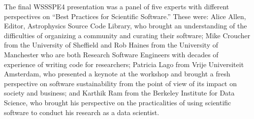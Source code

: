 \documentclass[11pt, oneside]{amsart}
\newcommand{\note}[1]{ {\textcolor{blueish}    { ***Note:      #1 }}}
\begin{document}







The final WSSSPE4 presentation was a panel %
of five experts with different perspectives on ``Best Practices for Scientific Software.''
These were: Alice Allen, Editor, Astrophysics Source Code Library, who brought an understanding of the difficulties of organizing a community and curating their software;
Mike Croucher from the University of Sheffield and Rob Haines from the University of Manchester who are both Research Software Engineers with decades of experience of writing code for researchers;
Patricia Lago from Vrije Universiteit Amsterdam, who presented a keynote at the workshop  and brought a fresh perspective on software sustainability from the point of view of its impact on society and business; and
Karthik Ram from the Berkeley Institute for Data Science, who brought his perspective on the practicalities of using scientific software to conduct his research as a data scientist.
\end{document}
